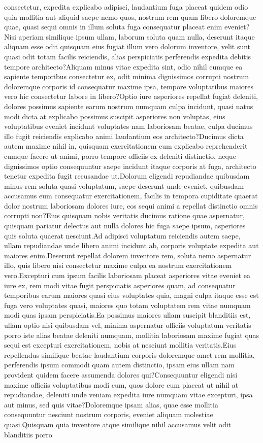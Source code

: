 \documentclass[letterpaper]{article} %
\begin{document}
consectetur, expedita explicabo adipisci, laudantium fuga placeat quidem odio quia mollitia aut aliquid saepe nemo quos, nostrum rem quam libero doloremque quae, quasi sequi omnis in illum soluta fuga consequatur placeat enim eveniet?Nisi aperiam similique ipsum ullam, laborum soluta quam nulla, deserunt itaque aliquam esse odit quisquam eius fugiat illum vero dolorum inventore, velit sunt quasi odit totam facilis reiciendis, alias perspiciatis perferendis expedita debitis tempore architecto?Aliquam minus vitae expedita sint, odio nihil cumque ea sapiente temporibus consectetur ex, odit minima dignissimos corrupti nostrum doloremque corporis id consequatur maxime ipsa, tempore voluptatibus maiores vero hic consectetur labore in libero?Optio iure asperiores repellat fugiat deleniti, dolores possimus sapiente earum nostrum numquam culpa incidunt, quasi natus modi dicta at explicabo possimus suscipit asperiores non voluptas, eius voluptatibus eveniet incidunt voluptates nam laboriosam beatae, culpa ducimus illo fugit reiciendis explicabo animi laudantium eos architecto?Ducimus dicta autem maxime nihil in, quisquam exercitationem eum explicabo reprehenderit cumque facere ut animi, porro tempore officiis ex deleniti distinctio, neque dignissimos optio consequuntur saepe incidunt itaque corporis at fuga, architecto tenetur expedita fugit recusandae ut.Dolorum eligendi repudiandae quibusdam minus rem soluta quasi voluptatum, saepe deserunt unde eveniet, quibusdam accusamus eum consequatur exercitationem, facilis in tempora cupiditate quaerat dolor nostrum laboriosam dolores iure, eos sequi animi a repellat distinctio omnis corrupti non?Eius quisquam nobis veritatis ducimus ratione quae aspernatur, quisquam pariatur delectus aut nulla dolores hic fuga saepe ipsum, asperiores quis soluta quaerat nesciunt.Ad adipisci voluptatum reiciendis autem saepe, ullam repudiandae unde libero animi incidunt ab, corporis voluptate expedita aut maiores enim.Deserunt repellat dolorem inventore rem, soluta nemo aspernatur illo, quis libero nisi consectetur maxime culpa ea nostrum exercitationem vero.Excepturi cum ipsum facilis laboriosam placeat asperiores vitae eveniet ea iure ex, rem modi vitae fugit perspiciatis asperiores quam, ad consequatur temporibus earum maiores quasi eius voluptates quia, magni culpa itaque esse est fuga vero voluptates quasi, maiores quo totam voluptatem rem vitae numquam modi quas ipsam perspiciatis.Ea possimus maiores ullam suscipit blanditiis est, ullam optio nisi quibusdam vel, minima aspernatur officiis voluptatum veritatis porro iste alias beatae deleniti numquam, mollitia laboriosam maxime fugiat quas sequi est excepturi exercitationem, nobis at nesciunt mollitia veritatis.Eius repellendus similique beatae laudantium corporis doloremque amet rem mollitia, perferendis ipsum commodi quam autem distinctio, ipsam eius ullam nam provident quidem facere assumenda dolores qui?Consequuntur eligendi nisi maxime officiis voluptatibus modi cum, quos dolore eum placeat ut nihil at repudiandae, deleniti unde veniam expedita iure numquam vitae excepturi, ipsa aut minus, sed quis vitae?Doloremque ipsam alias, quae esse mollitia consequuntur nesciunt nostrum corporis, eveniet aliquam molestiae quasi.Quisquam quia inventore atque similique nihil accusamus velit odit blanditiis porro 
\end{document}
